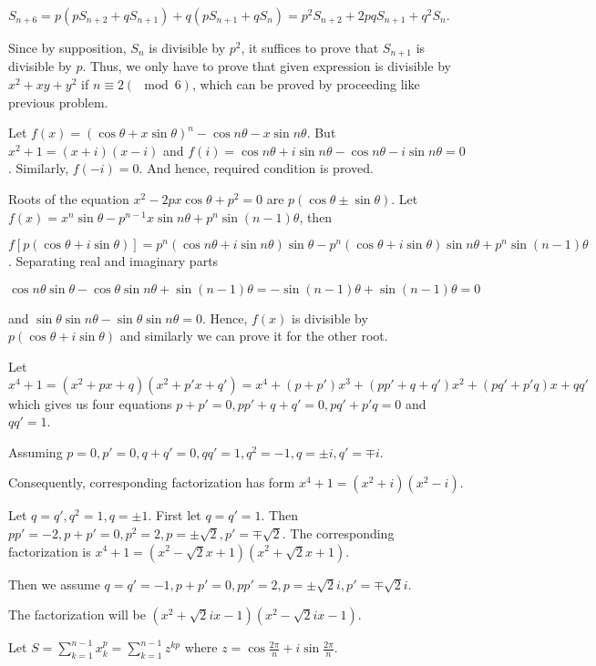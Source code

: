   $S_{n + 6} = p(pS_{n + 2} + qS_{n + 1}) + q(pS_{n + 1} + qS_n) = p^2S_{n + 2} + 2pqS_{n + 1} + q^2S_n$.

  Since by supposition, $S_n$ is divisible by $p^2$, it suffices to prove that $S_{n + 1}$ is divisible by
  $p$. Thus, we only have to prove that given expression is divisible by $x^2 + xy + y^2$ if $n\equiv
  2(\mod 6)$, which can be proved by proceeding like previous problem.
\item Let $f(x) = (\cos\theta + x\sin\theta)^n - \cos n\theta - x\sin n\theta$. But $x^2 + 1 = (x + i)(x -
  i)$ and $f(i) = \cos n\theta + i\sin n\theta - \cos n\theta - i\sin n\theta = 0$. Similarly, $f(-i) =
  0$. And hence, required condition is proved.
\item Roots of the equation $x^2 - 2px\cos\theta + p^2 = 0$ are $p(\cos\theta\pm\sin\theta)$. Let $f(x) =
  x^n\sin\theta - p^{n - 1}x\sin n\theta + p^n\sin(n - 1)\theta$, then

  $f[p(\cos\theta + i\sin\theta)] = p^n(\cos n\theta + i\sin n\theta)\sin\theta - p^n(\cos\theta + i\sin
  \theta)\sin n\theta + p^n\sin(n - 1)\theta$. Separating real and imaginary parts

  $\cos n\theta\sin\theta - \cos\theta\sin n\theta + \sin(n - 1)\theta = -\sin(n - 1)\theta + \sin(n -
  1)\theta = 0$

  and $\sin\theta\sin n\theta - \sin\theta\sin n\theta = 0$. Hence, $f(x)$ is divisible by $p(\cos\theta +
  i\sin\theta)$ and similarly we can prove it for the other root.
\item Let $x^4 + 1 = (x^2 + px + q)(x^2 + p'x + q') = x^4 + (p + p')x^3 + (pp' + q + q')x^2 + (pq' + p'q)x +
  qq'$ which gives us four equations $p + p' = 0, pp' + q + q' = 0, pq' + p'q = 0$ and $qq' = 1$.

  Assuming $p = 0, p' = 0, q + q' = 0, qq' = 1, q^2 = -1, q = \pm i, q' = \mp i$.

  Consequently, corresponding factorization has form $x^4 + 1 = (x^2 + i)(x^2 - i)$.

  Let $q = q', q^2 = 1, q = \pm 1$. First let $q = q' = 1$. Then $pp' = -2, p + p' = 0, p^2 = 2, p =
  \pm\sqrt{2}, p' = \mp\sqrt{2}$. The corresponding factorization is $x^4 + 1 = (x^2 - \sqrt{2}x + 1)(x^2 +
  \sqrt{2}x + 1)$.

  Then we assume $q = q' = -1, p + p' = 0, pp' = 2, p = \pm \sqrt{2}i, p' = \mp\sqrt{2}i$.

  The factorization will be $(x^2 + \sqrt{2}ix - 1)(x^2 - \sqrt{2}ix - 1)$.
\item Let $S = \displaystyle\sum_{k = 1}^{n - 1}x_k^p = \sum_{k = 1}^{n - 1}z^{kp}$ where $z =
  \cos\frac{2\pi}{n} + i\sin\frac{2\pi}{n}$.

